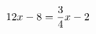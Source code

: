\documentclass[preview]{standalone}
\begin{document}
\begin{align*}
\special{dvisvgm:raw <g id='unique000'>}12x - 8 = \frac{3}{4}x - 2\special{dvisvgm:raw </g>}
\end{align*}
\end{document}
